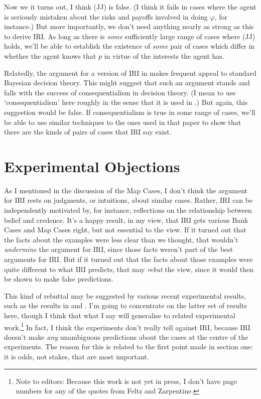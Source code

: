 \documentclass[oneside]{book}
\begin{document}
\noindent Now we it turns out, I think (JJ) is false. (I think it fails in cases where the agent is seriously mistaken about the risks and payoffs involved in doing $\varphi$, for instance.) But more importantly, we don't need anything nearly as strong as this to derive IRI. As long as there is \textit{some} sufficiently large range of cases where (JJ) holds, we'll be able to establish the existence of \textit{some} pair of cases which differ in whether the agent knows that $p$ in virtue of the interests the agent has.

Relatedly, the argument for a version of IRI in \cite{Weatherson2005-WEACWD} makes frequent appeal to standard Bayesian decision theory. This might suggest that such an argument stands and falls with the success of consequentialism in decision theory. (I mean to use `consequentialism' here roughly in the sense that it is used in \cite{Hammond1988}.) But again, this suggestion would be false. If consequentialism is true in some range of cases, we'll be able to use similar techniques to the ones used in that paper to show that there are the kinds of pairs of cases that IRI say exist.

\section{Experimental Objections} \label{sect:xphi}
As I mentioned in the discussion of the Map Cases, I don't think the argument for IRI rests on judgments, or intuitions, about similar cases. Rather, IRI can be independently motivated by, for instance, reflections on the relationship between belief and credence. It's a happy result, in my view, that IRI gets various Bank Cases and Map Cases right, but not essential to the view. If it turned out that the facts about the examples were less clear than we thought, that wouldn't \textit{undermine} the argument for IRI, since those facts weren't part of the best arguments for IRI. But if it turned out that the facts about those examples were quite different to what IRI predicts, that may \textit{rebut} the view, since it would then be shown to make false predictions.

This kind of rebuttal may be suggested by various recent experimental results, such as the results in \cite{May2010} and \cite{FeltzZarpentine2010}. I'm going to concentrate on the latter set of results here, though I think that what I say will generalise to related experimental work.\footnote{Note to editors: Because this work is not yet in press, I don't have page numbers for any of the quotes from Feltz and Zarpentine.} In fact, I think the experiments don't really tell against IRI, because IRI doesn't make \textit{any} unambiguous predictions about the cases at the centre of the experiments. The reason for this is related to the first point made in section one: it is odds, not stakes, that are most important.
\end{document}
